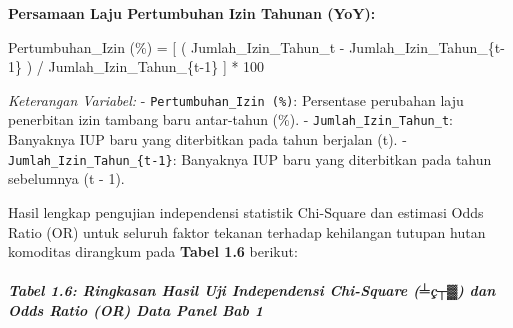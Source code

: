 \documentclass[
]{article}
\newenvironment{Shaded}{}{}
\newcommand{\NormalTok}[1]{#1}
\begin{document}
\textbf{Persamaan Laju Pertumbuhan Izin Tahunan (YoY):}

\begin{Shaded}
\begin{Highlighting}[]
\NormalTok{Pertumbuhan\_Izin (\%) = [ ( Jumlah\_Izin\_Tahun\_t {-} Jumlah\_Izin\_Tahun\_\{t{-}1\} ) / Jumlah\_Izin\_Tahun\_\{t{-}1\} ] * 100}
\end{Highlighting}
\end{Shaded}

\emph{Keterangan Variabel:} - \texttt{Pertumbuhan\_Izin\ (\%)}:
Persentase perubahan laju penerbitan izin tambang baru antar-tahun (\%).
- \texttt{Jumlah\_Izin\_Tahun\_t}: Banyaknya IUP baru yang diterbitkan
pada tahun berjalan (t). - \texttt{Jumlah\_Izin\_Tahun\_\{t-1\}}:
Banyaknya IUP baru yang diterbitkan pada tahun sebelumnya (t - 1).

Hasil lengkap pengujian independensi statistik Chi-Square dan estimasi
Odds Ratio (OR) untuk seluruh faktor tekanan terhadap kehilangan tutupan
hutan komoditas dirangkum pada \textbf{Tabel 1.6} berikut:

\subparagraph{Tabel 1.6: Ringkasan Hasil Uji Independensi Chi-Square
(╧ç┬▓) dan Odds Ratio (OR) Data Panel Bab
1}\label{tabel-1.6-ringkasan-hasil-uji-independensi-chi-square-uxe7-dan-odds-ratio-or-data-panel-bab-1}
\end{document}
